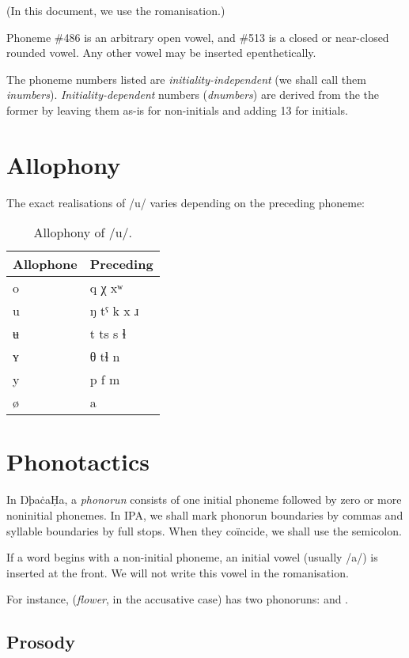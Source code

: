 \documentclass{book}
\newcommand{\lname}{ŊþaċaḤa}
\begin{document}
(In this document, we use the romanisation.)

Phoneme \#486 is an arbitrary open vowel, and \#513 is a closed or near-closed rounded vowel. Any other vowel may be inserted epenthetically.

The phoneme numbers listed are \emph{initiality-independent} (we shall call them \emph{inumbers}). \emph{Initiality-dependent} numbers (\emph{dnumbers}) are derived from the the former by leaving them as-is for non-initials and adding 13 for initials.

\section{Allophony}

The exact realisations of /u/ varies depending on the preceding phoneme:

\begin{table}[ht]
  \caption{Allophony of /u/.}
  \centering
  \begin{tabu}{l|Y}
    Allophone & Preceding \\
    \hline
    o & q χ xʷ \\
    u & ŋ tˤ k x ɹ \\
    ʉ & t ts s ɬ \\
    ʏ & θ tɬ n \\
    y & p f m \\
    ø & a \\
  \end{tabu}
\end{table}

\section{Phonotactics}

In \lname, a \emph{phonorun} consists of one initial phoneme followed by zero or more noninitial phonemes. In IPA, we shall mark phonorun boundaries by commas and syllable boundaries by full stops. When they coïncide, we shall use the semicolon.

If a word begins with a non-initial phoneme, an initial vowel (usually /a/) is inserted at the front. We will not write this vowel in the romanisation.

For instance,  (\emph{flower}, in the accusative case) has two phonoruns:  and .

\subsection{Prosody}
\end{document}
